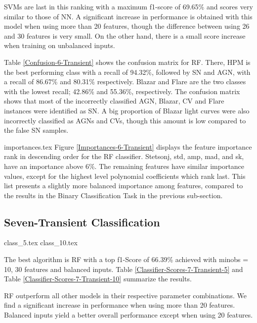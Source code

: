 \documentclass[a4paper,fleqn,usenatbib]{mnras}
\begin{document}
SVMs are last in this ranking with a maximum f1-score of 69.65\% and
scores very similar to those of NN. 
A significant increase in performance is obtained with this model when
using more than 20 features, though the difference between using 26
and 30 features is very small. 
On the other hand, there is a small score increase when training
on unbalanced inputs.

Table \ref{Confusion-6-Transient} shows the confusion matrix for RF. 
There, HPM is the best performing class with a recall of 94.32\%, 
followed by SN and AGN, with a recall of 86.67\% and 80.31\%
respectively. 
Blazar and Flare are the two classes with the lowest recall; 42.86\%
and 55.36\%, respectively. 
The confusion matrix shows that most of the incorrectly
classified AGN, Blazar, CV and Flare instances were identified as
SN. A big proportion of Blazar light curves were also incorrectly
classified as AGNs and CVs, though this amount is low compared to the
false SN samples. 


{importances.tex} Figure
\ref{Importances-6-Transient} displays the feature importance rank in
descending order for the RF classifier.
Stetson\textunderscore j, std, amp, mad, and sk, have an importance above 6\%. 
The remaining features have similar importance values, except
for the highest level polynomial coefficients which rank last.
This list presents a slightly more balanced importance among features,
compared to the results in the Binary Classification Task in the
previous sub-section.


\subsection{Seven-Transient Classification}

{class_5.tex}
{class_10.tex}

The best algorithm is RF with a top f1-Score of 66.39\% achieved with 
min\textunderscore obs = 10, 30 features and balanced inputs.
Table \ref{Classifier-Scores-7-Transient-5} and Table
\ref{Classifier-Scores-7-Transient-10} summarize the results.

RF outperform all other models in their respective parameter
combinations. 
We find a significant increase in performance when using more than 20
features. 
Balanced inputs yield a better overall performance except when using 20 
features. 
\end{document}
